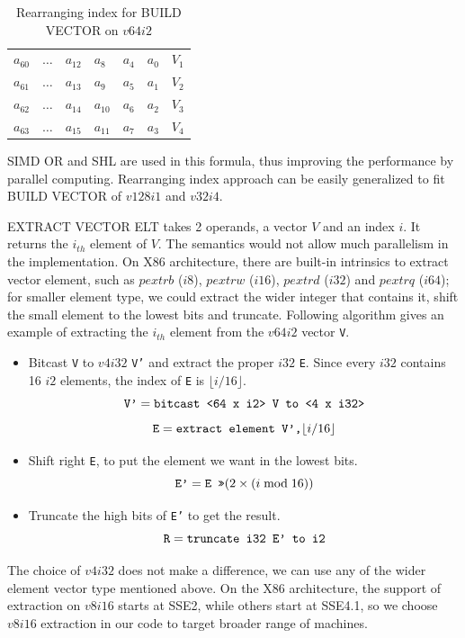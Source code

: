 \begin{table}[h]
\centering
\begin{tabular}{|p{1cm}|p{1cm}|p{1cm}|p{1cm}|p{1cm}|p{1cm}|r}
\cline{1-6}
$a_{60}$ & $\ldots$ & $a_{12}$ & $a_8$ & $a_4$ & $a_0$ & $V_1$ \\ \cline{1-6}
$a_{61}$ & $\ldots$ & $a_{13}$ & $a_9$ & $a_5$ & $a_1$ & $V_2$ \\ \cline{1-6}
$a_{62}$ & $\ldots$ & $a_{14}$ & $a_{10}$ & $a_6$ & $a_2$ & $V_3$ \\ \cline{1-6}
$a_{63}$ & $\ldots$ & $a_{15}$ & $a_{11}$ & $a_7$ & $a_3$ & $V_4$ \\ \cline{1-6}
\end{tabular}
\caption{Rearranging index for BUILD VECTOR on $v64i2$}
\label{table:build_vector}
\end{table}

SIMD OR and SHL are used in this formula, thus improving the performance by parallel computing. Rearranging index approach can be easily generalized to fit BUILD VECTOR of $v128i1$ and $v32i4$.

EXTRACT VECTOR ELT takes 2 operands, a vector $V$ and an index $i$. It returns the $i_{th}$ element of $V$. The semantics would not allow much parallelism in the implementation. On X86 architecture, there are built-in intrinsics to extract vector element, such as $pextrb$ ($i8$), $pextrw$ ($i16$), $pextrd$ ($i32$) and $pextrq$ ($i64$); for smaller element type, we could extract the wider integer that contains it, shift the small element to the lowest bits and truncate. Following algorithm gives an example of extracting the $i_{th}$ element from the $v64i2$ vector {\tt V}.

\begin{itemize}
  \item Bitcast {\tt V} to $v4i32$ {\tt V'} and extract the proper $i32$ {\tt E}. Since every $i32$ contains 16 $i2$ elements, the index of {\tt E} is $\lfloor i / 16 \rfloor$.
  \[\text{\tt V'} = \text{\tt bitcast <64 x i2> V to <4 x i32>} \]
  \[\text{\tt E} = \text{\tt extract element V',} \lfloor i / 16 \rfloor \]
  \item Shift right {\tt E}, to put the element we want in the lowest bits.
  \[\text{\tt E'} = \text{\tt E >>} (2 \times (i \bmod 16))\]
  \item Truncate the high bits of {\tt E'} to get the result.
  \[\text{\tt R} = \text{\tt truncate i32 E' to i2}\]
\end{itemize}

The choice of $v4i32$ does not make a difference, we can use any of the wider element vector type mentioned above. On the X86 architecture, the support of extraction on $v8i16$ starts at SSE2, while others start at SSE4.1, so we choose $v8i16$ extraction in our code to target broader range of machines.


